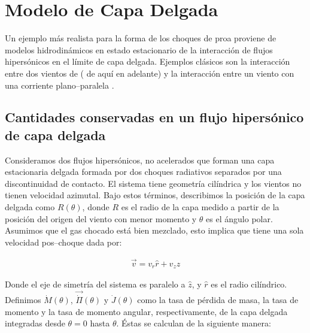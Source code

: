 \chapter{Modelo de Capa Delgada}
\label{chap:hipersonica}

\newcommand\CRW{\citetalias{Canto:1996}}

Un ejemplo más realista para la forma de los choques de proa proviene de modelos hidrodinámicos en estado estacionario de la interacción de flujos hipersónicos en el límite de capa delgada. Ejemplos clásicos son la interacción entre dos vientos de \citet{Canto:1996} (\CRW{} de aquí en adelante) y la interacción entre un viento con una corriente plano--paralela \citep{Wilkin:1996}. 
\section{Cantidades conservadas en un flujo hipersónico de capa delgada}

Consideramos dos flujos hipersónicos, no acelerados que forman una capa estacionaria delgada formada por dos choques radiativos separados por una discontinuidad de contacto. El sistema tiene geometría cilíndrica y los vientos no tienen velocidad azimutal. Bajo estos términos, describimos la posición de la capa delgada como $R(\theta)$, donde $R$ es el radio de la capa medido a partir de la posición del origen del viento con menor momento y $\theta$ es el ángulo polar. Asumimos que el gas chocado está bien mezclado, esto implica que  tiene una sola velocidad pos--choque dada por:

\begin{align}
  \vec{v} = v_r \hat{r} + v_z \hat{z}
\end{align}

Donde el eje de simetría del sistema es paralelo a $\hat{z}$, y $\hat{r}$ es el radio cilíndrico. Definimos $\dot{M}(\theta)$, $\vec{\dot{\Pi}}(\theta)$ y $\dot{J}(\theta)$ como la tasa de pérdida de masa, la tasa de momento y la tasa de momento angular, respectivamente, de la capa delgada integradas desde $\theta=0$ hasta $\theta$. Éstas se calculan de la siguiente manera:

